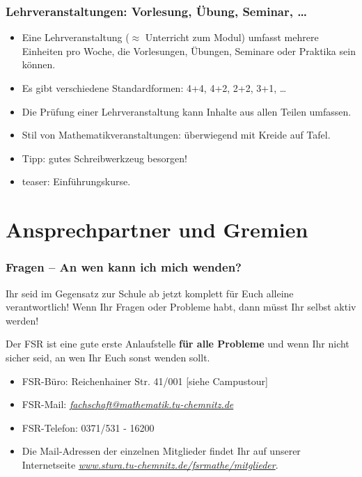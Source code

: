 \documentclass[10pt]{beamer}
\makeatletter
\newcommand{\highl}[1]{\color{tuccolor@ma}#1\color{black}}
\makeatother
\begin{document}
\begin{frame}
	\frametitle{Lehrveranstaltungen: Vorlesung, Übung, Seminar, \ldots}

	\begin{itemize}
		\item Eine Lehrveranstaltung ($\approx$ Unterricht zum Modul) umfasst mehrere Einheiten pro Woche, die Vorlesungen, Übungen, Seminare oder Praktika sein können. 
		\item Es gibt verschiedene Standardformen: 4+4, 4+2, 2+2, 3+1, \ldots
		\item Die Prüfung einer Lehrveranstaltung kann Inhalte aus allen Teilen umfassen.
		\item Stil von Mathematikveranstaltungen: überwiegend mit Kreide auf Tafel.
		\item Tipp: gutes Schreibwerkzeug besorgen!
		\item teaser: Einführungskurse.
	\end{itemize}
\end{frame}


\section{Ansprechpartner und Gremien}
\frame{\tableofcontents[currentsection]}

\begin{frame}
	\frametitle{Fragen -- An wen kann ich mich wenden?}

	Ihr seid im Gegensatz zur Schule ab jetzt komplett für Euch alleine verantwortlich! Wenn Ihr Fragen oder Probleme habt, dann müsst Ihr selbst aktiv werden!

	\begin{block}{\vphantom{X}}
		Der FSR ist eine gute erste Anlaufstelle \textbf{für alle Probleme} und wenn Ihr nicht sicher seid, an wen Ihr Euch sonst wenden sollt.
	\end{block}

	\begin{itemize}
		\item FSR-Büro: Reichenhainer Str. 41/001 [siehe Campustour]
		\item FSR-Mail: \highl{\textit{\href{mailto:fachschaft@mathematik.tu-chemnitz.de}{fachschaft@mathematik.tu-chemnitz.de}}}
		\item FSR-Telefon: 0371/531 - 16200
		\item Die Mail-Adressen der einzelnen Mitglieder findet Ihr auf unserer Internetseite \highl{\textit{\href{https://www.stura.tu-chemnitz.de/fsrmathe/mitglieder}{www.stura.tu-chemnitz.de/fsrmathe/mitglieder}}}.
	\end{itemize}
\end{frame}
\end{document}
